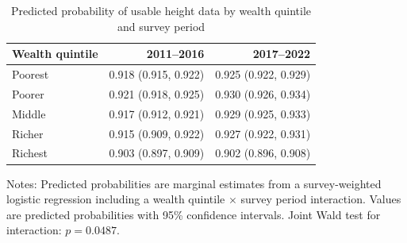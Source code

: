 \begin{table}[ht]
\centering
\caption{Predicted probability of usable height data by wealth quintile and survey period}
\label{tab:pp_wealth}
\begin{threeparttable}

\small
\renewcommand{\arraystretch}{1.15}
\setlength{\tabcolsep}{10pt}

\begin{tabularx}{\textwidth}{>{\raggedright\arraybackslash}X r r}
\toprule

\textbf{Wealth quintile} & \textbf{2011--2016} & \textbf{2017--2022} \\
\midrule
Poorest & 0.918 (0.915, 0.922) & 0.925 (0.922, 0.929) \\
Poorer  & 0.921 (0.918, 0.925) & 0.930 (0.926, 0.934) \\
Middle  & 0.917 (0.912, 0.921) & 0.929 (0.925, 0.933) \\
Richer  & 0.915 (0.909, 0.922) & 0.927 (0.922, 0.931) \\
Richest & 0.903 (0.897, 0.909) & 0.902 (0.896, 0.908) \\
\bottomrule
\end{tabularx}

\begin{tablenotes}[flushleft]
\footnotesize
\item Notes: Predicted probabilities are marginal estimates from a survey-weighted logistic regression including a wealth quintile $\times$ survey period interaction. Values are predicted probabilities with 95\% confidence intervals. Joint Wald test for interaction: \(p=0.0487\).
\end{tablenotes}

\end{threeparttable}
\end{table}
